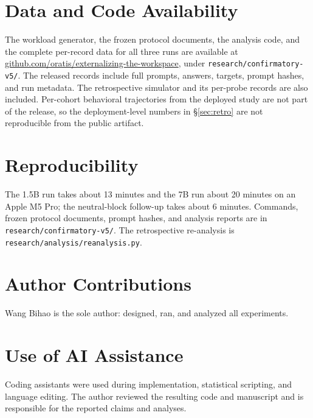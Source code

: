 \documentclass[11pt]{article}
\begin{document}
\section*{Data and Code Availability}
The workload generator, the frozen protocol documents, the analysis code, and the complete per-record data for all three runs are available at \href{https://github.com/oratis/externalizing-the-workspace}{github.com/oratis/externalizing-the-workspace}, under \texttt{research/confirmatory-v5/}. The released records include full prompts, answers, targets, prompt hashes, and run metadata. The retrospective simulator and its per-probe records are also included. Per-cohort behavioral trajectories from the deployed study are not part of the release, so the deployment-level numbers in \S\ref{sec:retro} are not reproducible from the public artifact.

\section*{Reproducibility}
The 1.5B run takes about 13 minutes and the 7B run about 20 minutes on an Apple M5 Pro; the neutral-block follow-up takes about 6 minutes. Commands, frozen protocol documents, prompt hashes, and analysis reports are in \texttt{research/confirmatory-v5/}. The retrospective re-analysis is \texttt{research/analysis/reanalysis.py}.

\section*{Author Contributions}
Wang Bihao is the sole author: designed, ran, and analyzed all experiments.

\section*{Use of AI Assistance}
Coding assistants were used during implementation, statistical scripting, and language editing. The author reviewed the resulting code and manuscript and is responsible for the reported claims and analyses.
\end{document}
